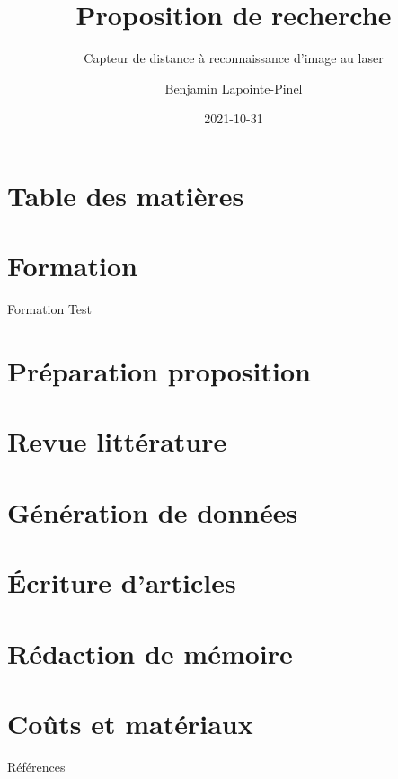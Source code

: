 \documentclass{beamer}
\title{Proposition de recherche}
\subtitle{Capteur de distance à reconnaissance d'image au laser}
\author{Benjamin Lapointe-Pinel}
\institute{UQAR}
\date{2021-10-31}
\begin{document}
\frame{\titlepage}

\section{Table des matières}

\section{Formation}

\begin{frame}{Formation}
	Test
\end{frame}

\section{Préparation proposition}
\section{Revue littérature}
\section{Génération de données}
\section{Écriture d'articles}
\section{Rédaction de mémoire}
\section{Coûts et matériaux}


\begin{frame}[allowframebreaks]{Références}
	\printbibliography
\end{frame}
\end{document}
